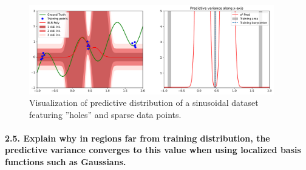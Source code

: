 \begin{figure}[H]
    \centering
    \includegraphics[width=0.95\textwidth]{phi_gaussian_hole.pdf}
    \caption{Visualization of predictive distribution of a sinusoidal dataset featuring ''holes'' and sparse data points.}
    \label{fig:phi_gaussian_hole}
\end{figure}

\paragraph*{2.5. Explain why in regions far from training distribution, the predictive variance converges to this value when using localized basis functions such as Gaussians.}


